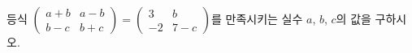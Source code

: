 \hspace*{2mm}\begin{minipage}[t]{\dimexpr\linewidth-2mm\relax}\vspace{0pt}
등식 $\begin{pmatrix} a+b & a-b \\ b-c & b+c \end{pmatrix}=\begin{pmatrix} 3 & b \\ -2 & 7-c \end{pmatrix}$를 만족시키는 실수 $a$, $b$, $c$의 값을 구하시오.\end{minipage}
